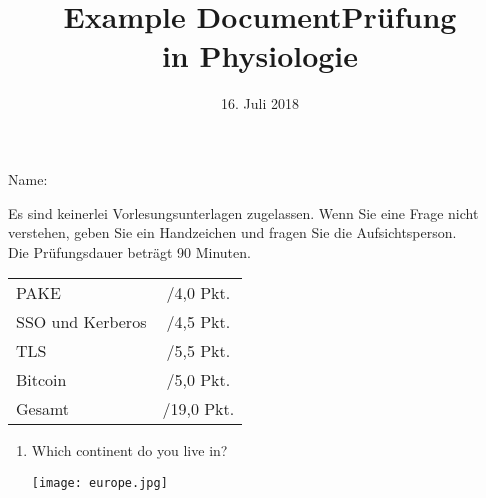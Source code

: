 \documentclass[12pt,onside,a4paper,article]{memoir}
\title{Example Document}
\begin{document}
\title{Prüfung \protect\\ 
in Physiologie}
\date{16. Juli 2018}
\maketitle

\begin{shaded}
Name: 
\end{shaded}

Es sind keinerlei Vorlesungsunterlagen zugelassen. Wenn Sie eine Frage nicht verstehen, geben Sie ein Handzeichen und fragen Sie die Aufsichtsperson.\\
Die Prüfungsdauer beträgt 90 Minuten.

\begin{center}

\begin{tabular}{lc}
PAKE &  \hspace*{1cm}/4,0 Pkt.
\\
SSO und Kerberos   & \hspace*{1cm}/4,5 Pkt.
\\
TLS   & \hspace*{1cm}/5,5 Pkt.
\\
Bitcoin &  \hspace*{1cm}/5,0 Pkt.
\\\hline
Gesamt &  \hspace*{1cm}/19,0 Pkt.
\end{tabular}

\vspace*{0.5cm}

\end{center}

\newpage

\begin{enumerate}\itemsep30mm




 \item{Which continent do you live in?}
    \begin{flushright}
    \end{flushright}
    \begin{flushleft}
    \texttt{[image: europe.jpg]}
    \end{flushleft}
    \end{enumerate}
\end{document}
